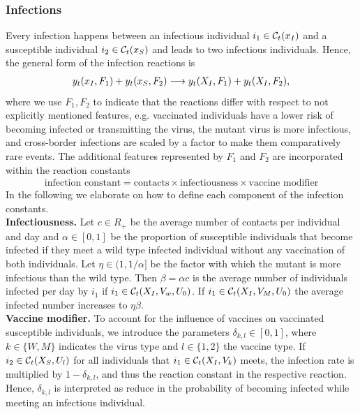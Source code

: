 \subsubsection{Infections}
Every infection happens between an infectious individual $i_1 \in \mathcal{C}_t(x_I)$ and a susceptible individual $i_2 \in \mathcal{C}_t(x_S)$ and leads to two infectious individuals. Hence, the general form of the infection reactions is
\begin{align}
\label{eq:general_infection}
y_t(x_I, F_1) + y_t(x_S, F_2) \longrightarrow y_t(X_I, F_1) + y_t(X_I, F_2),
\end{align}
where we use $F_1, F_2$ to indicate that the reactions differ with respect to not explicitly mentioned features, e.g. vaccinated individuals have a lower risk of becoming infected or transmitting the virus, the mutant virus is more infectious, and cross-border infections are scaled by a factor to make them comparatively rare events. %
The additional features represented by $F_1$ and $F_2$ are incorporated within the reaction constants
\begin{align*}
\text{infection constant} = \text{contacts} \times \text{infectiousness} \times \text{vaccine modifier} 
\end{align*}
In the following we elaborate on how to define each component of the infection constants.\\

\textbf{Infectiousness.} Let $c \in R_+$ be the average number of contacts per individual and day and $\alpha \in [0,1]$ be the proportion of susceptible individuals that become infected if they meet a wild type infected individual without any vaccination of both individuals. Let $\eta \in (1, 1/\alpha]$ be the factor with which the mutant is more infectious than the wild type. Then $\beta = \alpha c$ is the average number of individuals infected per day by $i_1$ if $i_1 \in \mathcal{C}_t(X_I, V_w, U_0)$. If $i_1 \in \mathcal{C}_t(X_I, V_M, U_0)$ the average infected number increases to $\eta \beta$. \\

\textbf{Vaccine modifier.}
To account for the influence of vaccines on vaccinated susceptible individuals, we introduce the parameters $\delta_{k,l} \in [0,1]$, where $k \in \{W, M\}$ indicates the virus type and $l \in \{ 1,2\}$ the vaccine type. If $i_2 \in \mathcal{C}_t(X_S, U_l) $ for all individuals that $i_1 \in \mathcal{C}_t(X_I, V_k)$ meets, the infection rate is multiplied by $1 - \delta_{k,l}$, and thus the reaction constant in the respective reaction. Hence, $\delta_{k,l}$ is interpreted as reduce in the probability of becoming infected while meeting an infectious individual.

